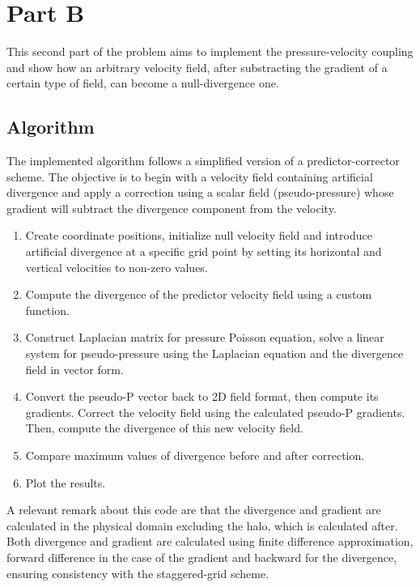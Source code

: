 \section{Part B}

This second part of the problem aims to implement the pressure-velocity coupling and show how an arbitrary velocity field, after substracting the gradient of a certain type of field, can become a null-divergence one.

\subsection{Algorithm}

The implemented algorithm follows a simplified version of a predictor-corrector scheme. The objective is to begin with a velocity field containing artificial divergence and apply a correction using a scalar field (pseudo-pressure) whose gradient will subtract the divergence component from the velocity.

\begin{enumerate}
    \item Create coordinate positions, initialize null velocity field and introduce artificial divergence at a specific grid point by setting its horizontal and vertical velocities to non-zero values.
    \item Compute the divergence of the predictor velocity field using a custom function.
    \item Construct Laplacian matrix for pressure Poisson equation, solve a linear system for pseudo-pressure using the Laplacian equation and the divergence field in vector form.
    \item Convert the pseudo-P vector back to 2D field format, then compute its gradients. Correct the velocity field using the calculated pseudo-P gradients. Then, compute the divergence of this new velocity field.
    \item Compare maximum values of divergence before and after correction.
    \item Plot the results.
\end{enumerate}

A relevant remark about this code are that the divergence and gradient are calculated in the physical domain excluding the halo, which is calculated after. Both divergence and gradient are calculated using finite difference approximation, forward difference in the case of the gradient and backward for the divergence, ensuring consistency with the staggered-grid scheme.


